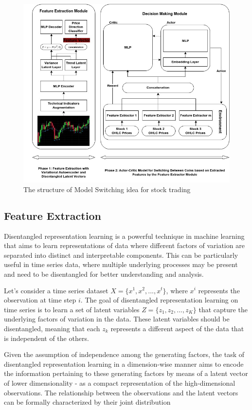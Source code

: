 \begin{figure}[H]
	\centering
	\includegraphics[scale=0.6]{./NewArch.jpg}
	\caption{The structure of Model Switching idea for stock trading}
	\label{fig:arch}
\end{figure}


\subsection{Feature Extraction}

Disentangled representation learning is a powerful technique in machine learning that aims to learn representations of data where different factors of variation are separated into distinct and interpretable components. This can be particularly useful in time series data, where multiple underlying processes may be present and need to be disentangled for better understanding and analysis.

Let's consider a time series dataset $X = \{x^1, x^2, ..., x^t\}$, where $x^i$ represents the observation at time step $i$. The goal of disentangled representation learning on time series is to learn a set of latent variables $Z = \{z_1, z_2, ..., z_K\}$ that capture the underlying factors of variation in the data. These latent variables should be disentangled, meaning that each $z_k$ represents a different aspect of the data that is independent of the others.

Given the assumption of independence among the generating factors, the task of disentangled representation learning in a dimension-wise manner aims to encode the information pertaining to these generating factors by means of a latent vector of lower dimensionality - as a compact representation of the high-dimensional observations. The relationship between the observations and the latent vectors can be formally characterized by their joint distribution

